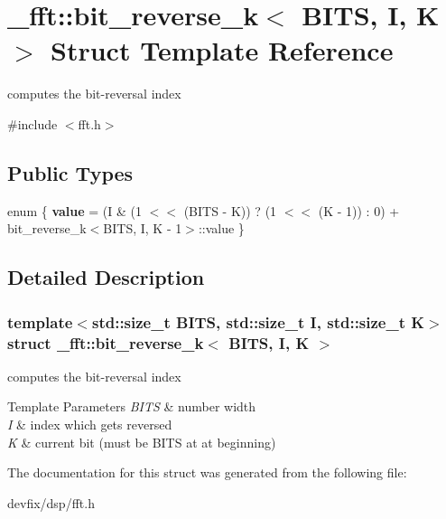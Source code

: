 \hypertarget{struct__fft_1_1bit__reverse__k}{}\section{\+\_\+fft\+:\+:bit\+\_\+reverse\+\_\+k$<$ B\+I\+TS, I, K $>$ Struct Template Reference}
\label{struct__fft_1_1bit__reverse__k}


computes the bit-\/reversal index  




{\ttfamily \#include $<$fft.\+h$>$}

\subsection*{Public Types}
\begin{DoxyCompactItemize}
\item 
\mbox{\label{struct__fft_1_1bit__reverse__k_ae8528f4355d0cf8b88a628b6d2484fba}} 
enum \{ {\bfseries value} = (I \& (1 $<$$<$ (B\+I\+TS -\/ K)) ? (1 $<$$<$ (K -\/ 1)) \+: 0) + bit\+\_\+reverse\+\_\+k$<$B\+I\+TS, I, K -\/ 1$>$\+:\+:value
 \}
\end{DoxyCompactItemize}


\subsection{Detailed Description}
\subsubsection*{template$<$std\+::size\+\_\+t B\+I\+TS, std\+::size\+\_\+t I, std\+::size\+\_\+t K$>$\newline
struct \+\_\+fft\+::bit\+\_\+reverse\+\_\+k$<$ B\+I\+T\+S, I, K $>$}

computes the bit-\/reversal index 


\begin{DoxyTemplParams}{Template Parameters}
{\em B\+I\+TS} & number width \\
\hline
{\em I} & index which gets reversed \\
\hline
{\em K} & current bit (must be B\+I\+TS at at beginning) \\
\hline
\end{DoxyTemplParams}


The documentation for this struct was generated from the following file\+:\begin{DoxyCompactItemize}
\item 
devfix/dsp/fft.\+h\end{DoxyCompactItemize}
